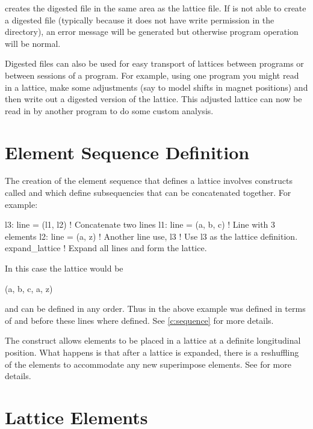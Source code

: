 \bmad creates the digested file in the same area as the lattice file.
If \bmad is not able to create a digested file (typically because it
does not have write permission in the directory), an error message will
be generated but otherwise program operation will be normal.

Digested files can also be used for easy transport of lattices between
programs or between sessions of a program. For example, using one
program you might read in a lattice, make some adjustments (say to model
shifts in magnet positions) and then write out a digested version of the
lattice. This adjusted lattice can now be read in by another program to
do some custom analysis.

\section{Element Sequence Definition}

The creation of the element sequence that defines a lattice involves
constructs called  and  which define subsequencies
that can be concatenated together. For example:
\begin{example}
  l3: line = (l1, l2)   ! Concatenate two lines
  l1: line = (a, b, c)  ! Line with 3 elements
  l2: line = (a, z)     ! Another line 
  use, l3               ! Use l3 as the lattice definition.
  expand_lattice        ! Expand all lines and form the lattice.
\end{example}
In this case the lattice would be
\begin{example}
  (a, b, c, a, z)
\end{example}
 and  can be defined in any order. Thus in the
above example  was defined in terms of  and 
before these lines where defined. See \cref{c:sequence} for more details.

The  construct allows elements to be placed in a
lattice at a definite longitudinal position. What happens is that
after a lattice is expanded, there is a reshuffling of the elements to
accommodate any new superimpose elements. See  for more
details.

\section{Lattice Elements}

